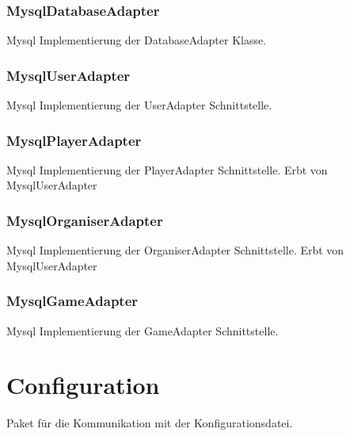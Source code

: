 \documentclass[a4paper]{scrreprt}
\begin{document}
	\subsubsection{MysqlDatabaseAdapter}
	Mysql Implementierung der DatabaseAdapter Klasse.
	
	\subsubsection{MysqlUserAdapter}
	Mysql Implementierung der UserAdapter Schnittstelle.
	
	\subsubsection{MysqlPlayerAdapter}
	Mysql Implementierung der PlayerAdapter Schnittstelle.
	Erbt von MysqlUserAdapter
	
	\subsubsection{MysqlOrganiserAdapter}
	Mysql Implementierung der OrganiserAdapter Schnittstelle.
	Erbt von MysqlUserAdapter
	
	\subsubsection{MysqlGameAdapter}
	Mysql Implementierung der GameAdapter Schnittstelle.
	
	\section{Configuration}
	Paket für die Kommunikation mit der Konfigurationsdatei.
	
\end{document}
